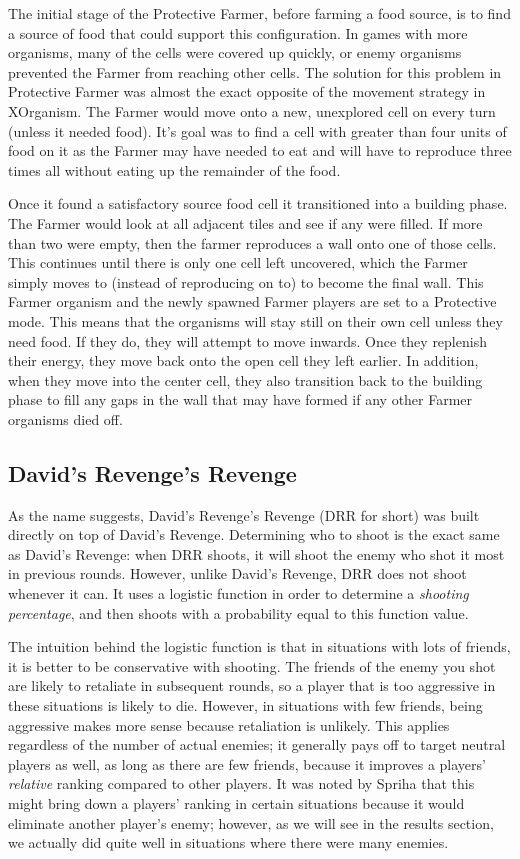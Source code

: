 \documentclass[
10pt, %
letterpaper, %
oneside, %
headinclude,footinclude, %
english
]{article}
\begin{document}
The initial stage of the Protective Farmer, before farming a food source, is to find a source of food that could support this configuration. In games with more organisms, many of the cells were covered up quickly, or enemy organisms prevented the Farmer from reaching other cells. The solution for this problem in Protective Farmer was almost the exact opposite of the movement strategy in XOrganism. The Farmer would move onto a new, unexplored cell on every turn (unless it needed food). It's goal was to find a cell with greater than four units of food on it as the Farmer may have needed to eat and will have to reproduce three times all without eating up the remainder of the food.

Once it found a satisfactory source food cell it transitioned into a building phase. The Farmer would look at all adjacent tiles and see if any were filled. If more than two were empty, then the farmer reproduces a wall onto one of those cells. This continues until there is only one cell left uncovered, which the Farmer simply moves to (instead of reproducing on to) to become the final wall. This Farmer organism and the newly spawned Farmer players are set to a Protective mode. This means that the organisms will stay still on their own cell unless they need food. If they do, they will attempt to move inwards. Once they replenish their energy, they move back onto the open cell they left earlier. In addition, when they move into the center cell, they also transition back to the building phase to fill any gaps in the wall that may have formed if any other Farmer organisms died off.

\subsection{David's Revenge's Revenge}

As the name suggests, David's Revenge's Revenge (DRR for short) was built directly on top of David's Revenge. Determining who to shoot is the exact same as David's Revenge: when DRR shoots, it will shoot the enemy who shot it most in previous rounds. However, unlike David's Revenge, DRR does not shoot whenever it can. It uses a logistic function in order to determine a \textit{shooting percentage}, and then shoots with a probability equal to this function value.

The intuition behind the logistic function is that in situations with lots of friends, it is better to be conservative with shooting. The friends of the enemy you shot are likely to retaliate in subsequent rounds, so a player that is too aggressive in these situations is likely to die. However, in situations with few friends, being aggressive makes more sense because retaliation is unlikely. This applies regardless of the number of actual enemies; it generally pays off to target neutral players as well, as long as there are few friends, because it improves a players' \textit{relative} ranking compared to other players. It was noted by Spriha that this might bring down a players' ranking in certain situations because it would eliminate another player's enemy; however, as we will see in the results section, we actually did quite well in situations where there were many enemies.
\end{document}
